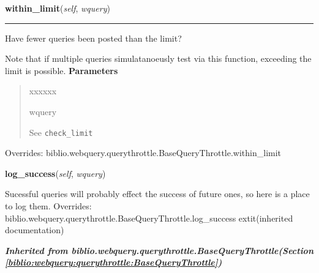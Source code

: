 \hspace{.8\funcindent}\begin{boxedminipage}{\funcwidth}

    \raggedright \textbf{within\_limit}(\textit{self}, \textit{wquery})

    \vspace{-1.5ex}

    \rule{\textwidth}{0.5\fboxrule}
\setlength{\parskip}{2ex}

Have fewer queries been posted than the limit?

Note that if multiple queries simulatanoeusly test via this function,
exceeding the limit is possible.
\setlength{\parskip}{1ex}
      \textbf{Parameters}
      \vspace{-1ex}

      \begin{quote}
        \begin{Ventry}{xxxxxx}

          \item[wquery]


See \texttt{check{\_}limit}
        \end{Ventry}

      \end{quote}

      Overrides: biblio.webquery.querythrottle.BaseQueryThrottle.within\_limit

    \end{boxedminipage}

    \vspace{0.5ex}

\hspace{.8\funcindent}\begin{boxedminipage}{\funcwidth}

    \raggedright \textbf{log\_success}(\textit{self}, \textit{wquery})

\setlength{\parskip}{2ex}

Sucessful queries will probably effect the success of future ones, so
here is a place to log them.
\setlength{\parskip}{1ex}
      Overrides: biblio.webquery.querythrottle.BaseQueryThrottle.log\_success 	extit{(inherited documentation)}

    \end{boxedminipage}


\large{\textbf{\textit{Inherited from biblio.webquery.querythrottle.BaseQueryThrottle\textit{(Section \ref{biblio:webquery:querythrottle:BaseQueryThrottle})}}}}

